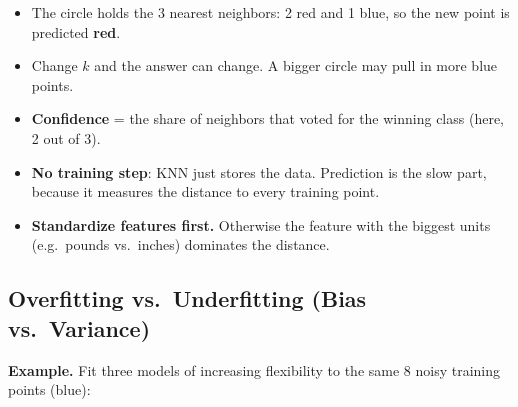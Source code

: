 \begin{itemize}
  \item The circle holds the 3 nearest neighbors: 2 red and 1 blue, so the new point is predicted \textbf{red}.
  \item Change $k$ and the answer can change. A bigger circle may pull in more blue points.
  \item \textbf{Confidence} = the share of neighbors that voted for the winning class (here, 2 out of 3).
  \item \textbf{No training step}: KNN just stores the data. Prediction is the slow part, because it measures the distance to every training point.
  \item \textbf{Standardize features first.} Otherwise the feature with the biggest units (e.g.\ pounds vs.\ inches) dominates the distance.
\end{itemize}

\subsection*{Overfitting vs.\ Underfitting (Bias vs.\ Variance)}

\textbf{Example.} Fit three models of increasing flexibility to the same 8 noisy training points (blue):

